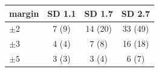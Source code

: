 \begin{tabular}{lccc}
\toprule
margin & SD 1.1 & SD 1.7 & SD 2.7 \\
\midrule
$\pm2$ & 7 (9) & 14 (20) & 33 (49) \\
$\pm3$ & 4 (4) & 7 (8) & 16 (18) \\
$\pm5$ & 3 (3) & 3 (4) & 6 (7) \\
\bottomrule
\end{tabular}
